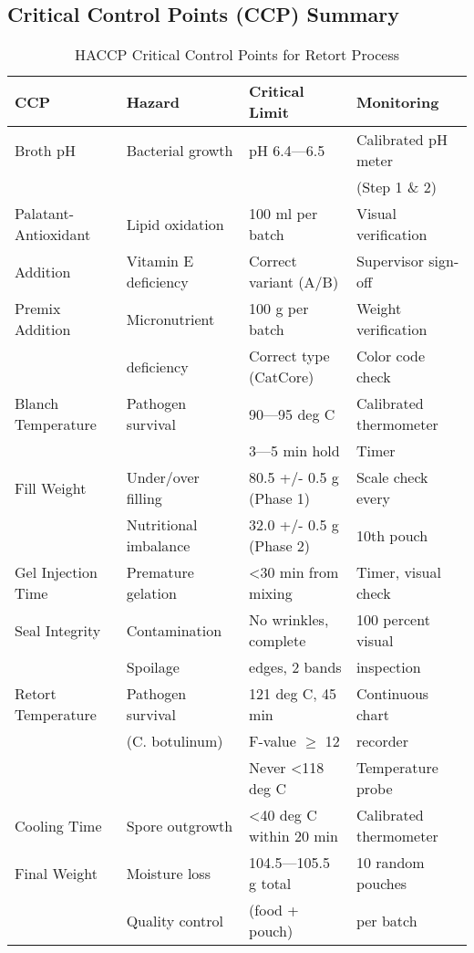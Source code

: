 {%

\subsection*{Critical Control Points (CCP) Summary}

\begin{table}[h]
\centering
\caption{HACCP Critical Control Points for Retort Process}
\label{tab:ccp}
\begin{tabular}{@{}llll@{}}
\toprule
\textbf{CCP} & \textbf{Hazard} & \textbf{Critical Limit} & \textbf{Monitoring} \\
\midrule
Broth pH & Bacterial growth & pH 6.4---6.5 & Calibrated pH meter \\
 & & & (Step 1 \& 2) \\
\midrule
Palatant-Antioxidant & Lipid oxidation & 100 ml per batch & Visual verification \\
Addition & Vitamin E deficiency & Correct variant (A/B) & Supervisor sign-off \\
\midrule
Premix Addition & Micronutrient & 100 g per batch & Weight verification \\
 & deficiency & Correct type (CatCore) & Color code check \\
\midrule
Blanch Temperature & Pathogen survival & 90---95 deg C & Calibrated thermometer \\
 & & 3---5 min hold & Timer \\
\midrule
Fill Weight & Under/over filling & 80.5 +/- 0.5 g (Phase 1) & Scale check every \\
 & Nutritional imbalance & 32.0 +/- 0.5 g (Phase 2) & 10th pouch \\
\midrule
Gel Injection Time & Premature gelation & <30 min from mixing & Timer, visual check \\
\midrule
Seal Integrity & Contamination & No wrinkles, complete & 100 percent visual \\
 & Spoilage & edges, 2 bands & inspection \\
\midrule
Retort Temperature & Pathogen survival & 121 deg C, 45 min & Continuous chart \\
 & (C. botulinum) & F-value $\ge$ 12 & recorder \\
 & & Never <118 deg C & Temperature probe \\
\midrule
Cooling Time & Spore outgrowth & <40 deg C within 20 min & Calibrated thermometer \\
\midrule
Final Weight & Moisture loss & 104.5---105.5 g total & 10 random pouches \\
 & Quality control & (food + pouch) & per batch \\
\bottomrule
\end{tabular}
\end{table}

}
